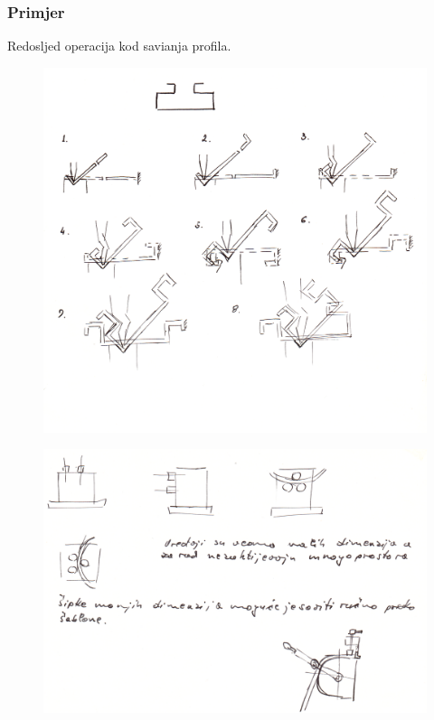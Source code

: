 \documentclass[a4paper,12pt]{article}
\numberwithin{figure}{section}
\begin{document}
\subsubsection*{Primjer}
Redosljed operacija kod savianja profila.
\begin{figure}[!h]
\centering
\includegraphics[scale=0.15]{image_50.png}
\end{figure}
\FloatBarrier
\clearpage
\begin{figure}[!h]
\centering
\includegraphics[scale=0.14]{image_51-1.png}
\end{figure}
\FloatBarrier
\end{document}
